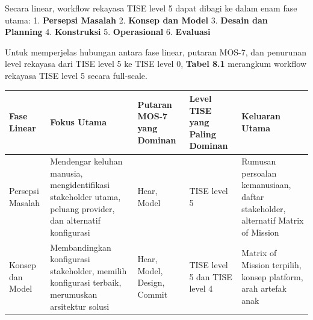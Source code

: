 \documentclass[
  letterpaper,
  DIV=11,
  numbers=noendperiod]{scrreprt}
\newcounter{none} %
\begin{document}

Secara linear, workflow rekayasa TISE level 5 dapat dibagi ke dalam enam
fase utama: 1. \textbf{Persepsi Masalah} 2. \textbf{Konsep dan Model} 3.
\textbf{Desain dan Planning} 4. \textbf{Konstruksi} 5.
\textbf{Operasional} 6. \textbf{Evaluasi}

Untuk memperjelas hubungan antara fase linear, putaran MOS-7, dan
penurunan level rekayasa dari TISE level 5 ke TISE level 0,
\textbf{Tabel 8.1} merangkum workflow rekayasa TISE level 5 secara
full-scale.

{\def\LTcaptype{none} %
\begin{longtable}[]{@{}
  >{\raggedright\arraybackslash}p{}
  >{\raggedright\arraybackslash}p{}
  >{\raggedright\arraybackslash}p{}
  >{\raggedright\arraybackslash}p{}
  >{\raggedright\arraybackslash}p{}@{}}
\toprule\noalign{}
\begin{minipage}[b]{\linewidth}\raggedright
Fase Linear
\end{minipage} & \begin{minipage}[b]{\linewidth}\raggedright
Fokus Utama
\end{minipage} & \begin{minipage}[b]{\linewidth}\raggedright
Putaran MOS-7 yang Dominan
\end{minipage} & \begin{minipage}[b]{\linewidth}\raggedright
Level TISE yang Paling Dominan
\end{minipage} & \begin{minipage}[b]{\linewidth}\raggedright
Keluaran Utama
\end{minipage} \\
\midrule\noalign{}
\endhead
\bottomrule\noalign{}
\endlastfoot
Persepsi Masalah & Mendengar keluhan manusia, mengidentifikasi
stakeholder utama, peluang provider, dan alternatif konfigurasi & Hear,
Model & TISE level 5 & Rumusan persoalan kemanusiaan, daftar
stakeholder, alternatif Matrix of Mission \\
Konsep dan Model & Membandingkan konfigurasi stakeholder, memilih
konfigurasi terbaik, merumuskan arsitektur solusi & Hear, Model, Design,
Commit & TISE level 5 dan TISE level 4 & Matrix of Mission terpilih,
konsep platform, arah artefak anak \\

\end{longtable}}
\end{document}
